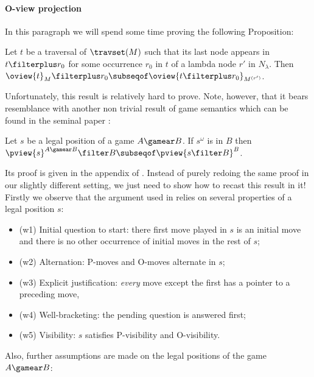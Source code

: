 \paragraph{O-view projection}
In this paragraph we will spend some time proving the following Proposition:
\begin{proposition}
\label{prop:oview_trav_projection}
   Let $t$ be a traversal of $\travset(M)$ such that its last node
   appears in $t \filterplus r_0$ for some occurrence $r_0$ in $t$ of a lambda node $r'$ in $N_\lambda$.
   Then $ \oview{t}_M\filterplus r_0 \subseqof \oview{t\filterplus r_0}_{M^{(r')}}$.
\end{proposition}
Unfortunately, this result is relatively hard to prove. Note, however, that it bears resemblance with another 
non trivial result of game semantics which can be found in the seminal paper \cite{hylandong_pcf}:
\begin{proposition}{\cite[Prop.4.3]{hylandong_pcf}}
\label{prop:hylandong_pviewprojection}
  Let $s$ be a legal position of a game $A\gamear B$.
  If $s^\omega$ is in $B$ then $\pview{s}^{A\gamear B} \filter B \subseqof \pview{s\filter B}^B$.
\end{proposition}
Its proof is given in the appendix of \cite{hylandong_pcf}. Instead of purely redoing the same proof in our slightly different setting, 
we just need to show how to recast this result in it! Firstly we observe that the
argument used in \cite{hylandong_pcf} relies on several properties of a legal position $s$:
\begin{itemize}
  \item (w1) Initial question to start: there first move played in $s$ is an initial move and there is no other occurrence of initial moves in the rest of $s$;
  \item(w2) Alternation: P-moves and O-moves alternate in $s$;
  \item(w3)  Explicit justification: \emph{every} move except the first has a pointer to a preceding move,
  \item(w4)  Well-bracketing: the pending question is answered first;
  \item(w5)  Visibility: $s$ satisfies P-visibility and
O-visibility.
\end{itemize}
Also, further assumptions are made on the legal positions of the game
$A\gamear B$:
